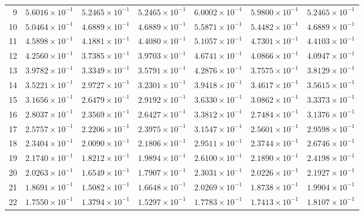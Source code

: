 \begin{table}[H]
\begin{tabular}{@{}rrrrrrr@{}}
9 & $5.6016\times10^{-1}$ & $5.2465\times10^{-1}$ & $5.2465\times10^{-1}$ & $6.0002\times10^{-1}$ & $5.9800\times10^{-1}$ & $5.2465\times10^{-1}$\\
10 & $5.0464\times10^{-1}$ & $4.6889\times10^{-1}$ & $4.6889\times10^{-1}$ & $5.5871\times10^{-1}$ & $5.4482\times10^{-1}$ & $4.6889\times10^{-1}$\\
11 & $4.5898\times10^{-1}$ & $4.1881\times10^{-1}$ & $4.4080\times10^{-1}$ & $5.1057\times10^{-1}$ & $4.7301\times10^{-1}$ & $4.4103\times10^{-1}$\\
12 & $4.2560\times10^{-1}$ & $3.7385\times10^{-1}$ & $3.9703\times10^{-1}$ & $4.6741\times10^{-1}$ & $4.0866\times10^{-1}$ & $4.0947\times10^{-1}$\\
13 & $3.9782\times10^{-1}$ & $3.3349\times10^{-1}$ & $3.5791\times10^{-1}$ & $4.2876\times10^{-1}$ & $3.7575\times10^{-1}$ & $3.8129\times10^{-1}$\\
14 & $3.5221\times10^{-1}$ & $2.9727\times10^{-1}$ & $3.2301\times10^{-1}$ & $3.9418\times10^{-1}$ & $3.4617\times10^{-1}$ & $3.5615\times10^{-1}$\\
15 & $3.1656\times10^{-1}$ & $2.6479\times10^{-1}$ & $2.9192\times10^{-1}$ & $3.6330\times10^{-1}$ & $3.0862\times10^{-1}$ & $3.3373\times10^{-1}$\\
16 & $2.8037\times10^{-1}$ & $2.3569\times10^{-1}$ & $2.6427\times10^{-1}$ & $3.3812\times10^{-1}$ & $2.7484\times10^{-1}$ & $3.1376\times10^{-1}$\\
17 & $2.5757\times10^{-1}$ & $2.2206\times10^{-1}$ & $2.3975\times10^{-1}$ & $3.1547\times10^{-1}$ & $2.5601\times10^{-1}$ & $2.9598\times10^{-1}$\\
18 & $2.3404\times10^{-1}$ & $2.0090\times10^{-1}$ & $2.1806\times10^{-1}$ & $2.9511\times10^{-1}$ & $2.3744\times10^{-1}$ & $2.6746\times10^{-1}$\\
19 & $2.1740\times10^{-1}$ & $1.8212\times10^{-1}$ & $1.9894\times10^{-1}$ & $2.6100\times10^{-1}$ & $2.1890\times10^{-1}$ & $2.4198\times10^{-1}$\\
20 & $2.0263\times10^{-1}$ & $1.6549\times10^{-1}$ & $1.7907\times10^{-1}$ & $2.3031\times10^{-1}$ & $2.0226\times10^{-1}$ & $2.1927\times10^{-1}$\\
21 & $1.8691\times10^{-1}$ & $1.5082\times10^{-1}$ & $1.6648\times10^{-1}$ & $2.0269\times10^{-1}$ & $1.8738\times10^{-1}$ & $1.9904\times10^{-1}$\\
22 & $1.7550\times10^{-1}$ & $1.3794\times10^{-1}$ & $1.5297\times10^{-1}$ & $1.7783\times10^{-1}$ & $1.7413\times10^{-1}$ & $1.8107\times10^{-1}$\\

\end{tabular}
\end{table}
